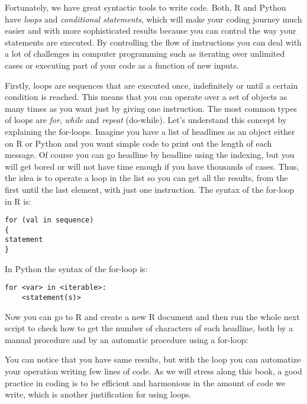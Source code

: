 Fortunately, we have great syntactic tools to write code. Both, R and
Python have \emph{loops} and \emph{conditional statements}, which will
make your coding journey much easier and with more sophisticated
results because you can control the way your statements are
executed. By controlling the flow of instructions you can deal with a
lot of challenges in computer programming such as iterating over
unlimited cases or executing part of your code as a function of new
inputs.

Firstly, loops are sequences that are executed once, indefinitely or
until a certain condition is reached. This means that you can operate
over a set of objects as many times as you want just by giving one
instruction. The most common types of loops are \emph{for},
\emph{while} and \emph{repeat} (do-while). Let’s understand this
concept by explaining the for-loops. Imagine you have a list of
headlines as an object either on R or Python and you want simple code
to print out the length of each message. Of course you can go headline
by headline using the indexing, but you will get bored or will not
have time enough if you have thousands of cases. Thus, the idea is to
operate a loop in the list so you can get all the results, from the
first until the last element, with just one instruction.  The syntax
of the for-loop in R is:

\begin{verbatim}
for (val in sequence)
{
statement
}
\end{verbatim}

In Python the syntax of the for-loop is:

\begin{verbatim}
for <var> in <iterable>:
    <statement(s)>
\end{verbatim}



Now you can go to R and create a new R document and then run the whole next script to check how to get the number of characters of each headline, both by a manual procedure and by an automatic procedure using a for-loop:



You can notice that you have same results, but with the loop you can automatize your operation writing few lines of code. As we will stress along this book, a good practice in coding is to be efficient and harmonious in the amount of code we write, which is another justification for using loops.  



